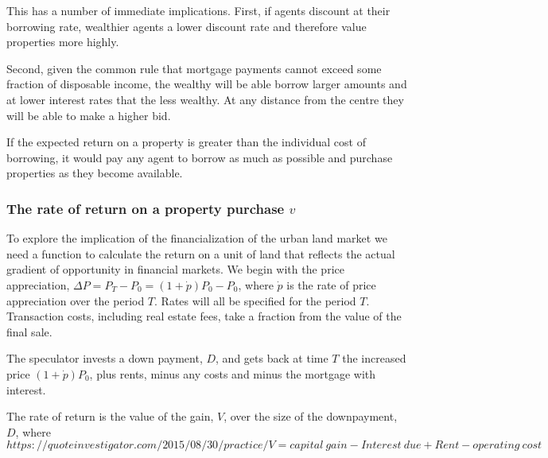 % 

This has a number of immediate implications. First, if agents discount at their borrowing rate, wealthier agents a lower discount rate and therefore value properties more highly. 

Second, given the  common rule that mortgage payments cannot exceed some fraction of disposable income, the wealthy will be able borrow larger amounts and at lower interest rates that the less wealthy. At any distance from the centre they will be able to make a higher bid.
 
If the expected return on a property is greater than the individual cost of borrowing, it would pay any agent to borrow as much as possible and purchase properties as they become available.

\subsubsection{The rate of return on a property purchase $v$}
To explore the implication of the financialization of the urban land market we need a function to calculate the return on a unit of land that reflects the actual gradient of opportunity in financial markets. We begin with the price appreciation, $\Delta P=P_T-P_0 = (1+\dot p)P_0-P_0 $, where $\dot p$ is the rate of price appreciation over the period $T$. Rates will all be specified for the period $T$. Transaction costs, including real estate fees, take a fraction from the value of the final sale.

 The speculator invests a down payment, $D$, and gets back at time $T$ the  increased price $(1+\dot p)P_0$, plus rents, minus any costs and minus the mortgage with interest.
 
The rate of return is the value of the gain, $V$,  over the size of the downpayment, $D$, where
\begin{equation}https://quoteinvestigator.com/2015/08/30/practice/
V =capital\ gain - Interest\ due  	+ Rent  - operating\ cost\    
\end{equation}

